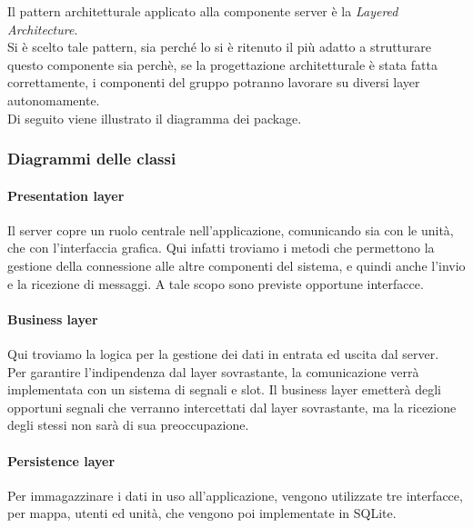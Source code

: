Il pattern architetturale applicato alla componente server è la \textit{Layered Architecture}. \\
Si è scelto tale pattern, sia perché lo si è ritenuto il più adatto a strutturare questo componente sia perchè, se la progettazione architetturale è stata fatta correttamente, i componenti del gruppo potranno lavorare su diversi layer autonomamente. \\
\newline
Di seguito viene illustrato il diagramma dei package.

\subsubsection{Diagrammi delle classi}

\paragraph{Presentation layer}
Il server copre un ruolo centrale nell'applicazione, comunicando sia con le unità, che con l'interfaccia grafica. Qui infatti troviamo i metodi che permettono la gestione della connessione alle altre componenti del sistema, e quindi anche l'invio e la ricezione di messaggi. A tale scopo sono previste opportune interfacce.

\paragraph{Business layer}
Qui troviamo la logica per la gestione dei dati in entrata ed uscita dal server. \\
Per garantire l'indipendenza dal layer sovrastante, la comunicazione verrà implementata con un sistema di segnali e slot. Il business layer emetterà degli opportuni segnali che verranno intercettati dal layer sovrastante, ma la ricezione degli stessi non sarà di sua preoccupazione.

\paragraph{Persistence layer}
Per immagazzinare i dati  in uso all'applicazione, vengono utilizzate tre interfacce, per mappa, utenti ed unità, che vengono poi implementate in SQLite.

